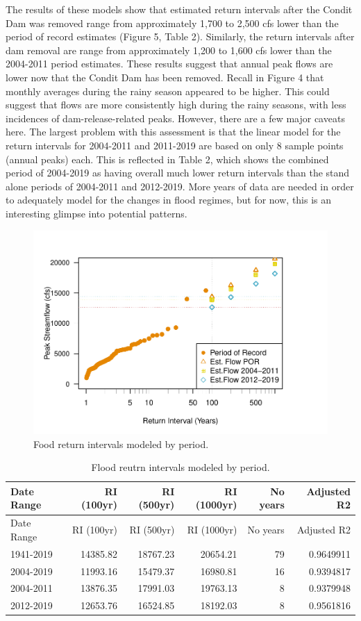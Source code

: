 \documentclass[
  12pt,
]{article}
\begin{document}
The results of these models show that estimated return intervals after
the Condit Dam was removed range from approximately 1,700 to 2,500 cfs
lower than the period of record estimates (Figure 5, Table 2).
Similarly, the return intervals after dam removal are range from
approximately 1,200 to 1,600 cfs lower than the 2004-2011 period
estimates. These results suggest that annual peak flows are lower now
that the Condit Dam has been removed. Recall in Figure 4 that monthly
averages during the rainy season appeared to be higher. This could
suggest that flows are more consistently high during the rainy seasons,
with less incidences of dam-release-related peaks. However, there are a
few major caveats here. The largest problem with this assessment is that
the linear model for the return intervals for 2004-2011 and 2011-2019
are based on only 8 sample points (annual peaks) each. This is reflected
in Table 2, which shows the combined period of 2004-2019 as having
overall much lower return intervals than the stand alone periods of
2004-2011 and 2012-2019. More years of data are needed in order to
adequately model for the changes in flood regimes, but for now, this is
an interesting glimpse into potential patterns.

\begin{figure}
\centering
\includegraphics{WhiteSalmon_WriteUp_files/figure-latex/fig5-1.pdf}
\caption{Food return intervals modeled by period.}
\end{figure}

\begin{longtable}[]{@{}lrrrrr@{}}
\caption{Flood reutrn intervals modeled by period.}\tabularnewline
\toprule
Date Range & RI (100yr) & RI (500yr) & RI (1000yr) & No years & Adjusted
R2\tabularnewline
\midrule
\endfirsthead
\toprule
Date Range & RI (100yr) & RI (500yr) & RI (1000yr) & No years & Adjusted
R2\tabularnewline
\midrule
\endhead
1941-2019 & 14385.82 & 18767.23 & 20654.21 & 79 &
0.9649911\tabularnewline
2004-2019 & 11993.16 & 15479.37 & 16980.81 & 16 &
0.9394817\tabularnewline
2004-2011 & 13876.35 & 17991.03 & 19763.13 & 8 &
0.9379948\tabularnewline
2012-2019 & 12653.76 & 16524.85 & 18192.03 & 8 &
0.9561816\tabularnewline
\bottomrule
\end{longtable}
\end{document}
